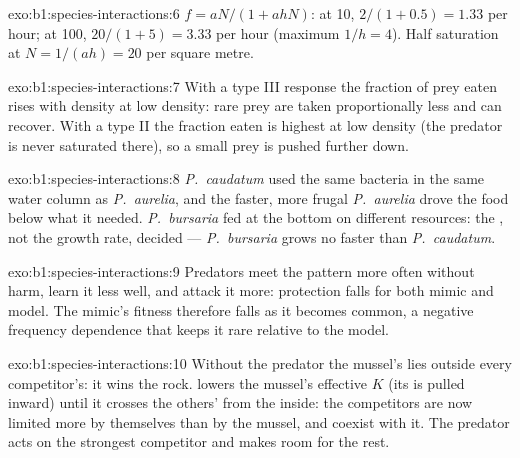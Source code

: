 \begin{solution}{exo:b1:species-interactions:6}
$f = aN/(1 + ahN)$: at 10, $2/(1 + 0.5) = 1.33$ per hour; at 100,
$20/(1 + 5) = 3.33$ per hour (maximum $1/h = 4$). Half saturation at
$N = 1/(ah) = 20$ per square metre.
\end{solution}

\begin{solution}{exo:b1:species-interactions:7}
With a type III response the fraction of prey eaten rises with
density at low density: rare prey are taken proportionally less and
can recover. With a type II the fraction eaten is highest at low
density (the predator is never saturated there), so a small prey
 is pushed further down.
\end{solution}

\begin{solution}{exo:b1:species-interactions:8}
\emph{P.~caudatum} used the same bacteria in the same water column
as \emph{P.~aurelia}, and the faster, more frugal \emph{P.~aurelia}
drove the food below what it needed. \emph{P.~bursaria} fed at the
bottom on different resources: the , not the growth rate, decided
--- \emph{P.~bursaria} grows no faster than \emph{P.~caudatum}.
\end{solution}

\begin{solution}{exo:b1:species-interactions:9}
Predators meet the pattern more often without harm, learn it less
well, and attack it more: protection falls for both mimic and model.
The mimic's fitness therefore falls as it becomes common, a negative
frequency dependence that keeps it rare relative to the model.
\end{solution}

\begin{solution}{exo:b1:species-interactions:10}
Without the predator the mussel's  lies outside every
competitor's: it wins the rock.  lowers the mussel's
effective $K$ (its  is pulled inward) until it crosses the
others'  from the inside: the competitors are now limited
more by themselves than by the mussel, and coexist with it. The
predator acts on the strongest competitor and makes room for the rest.
\end{solution}


